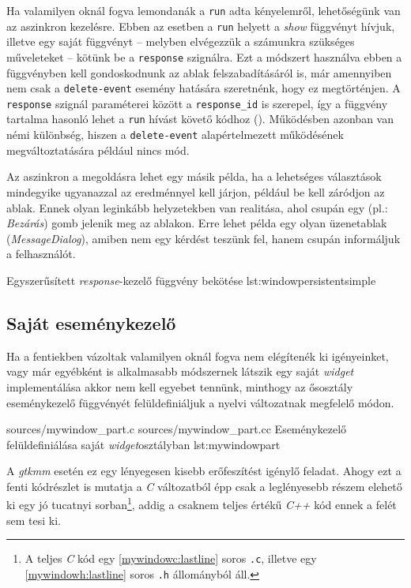 Ha valamilyen oknál fogva lemondanák a \texttt{run} adta kényelemről, lehetőségünk van az aszinkron kezelésre. Ebben az esetben a \texttt{run} helyett a \textit{show} függvényt hívjuk, illetve egy saját függvényt -- melyben elvégezzük a számunkra szükséges műveleteket -- kötünk be a \texttt{response} szignálra. Ezt a módszert használva ebben a függvényben kell gondoskodnunk az ablak felszabadításáról is, már amennyiben nem csak a \texttt{delete-event} esemény hatására szeretnénk, hogy ez megtörténjen. A \texttt{response} szignál paraméterei között a \texttt{response\_id} is szerepel, így a függvény tartalma hasonló lehet a \texttt{run} hívást követő kódhoz (). Működésben azonban van némi különbség, hiszen a \texttt{delete-event} alapértelmezett működésének megváltoztatására például nincs mód.

Az aszinkron a megoldásra lehet egy másik példa, ha a lehetséges választások mindegyike ugyanazzal az eredménnyel kell járjon, például be kell záródjon az ablak. Ennek olyan leginkább helyzetekben van realitása, ahol csupán egy (pl.: \textit{Bezárás}) gomb jelenik meg az ablakon. Erre lehet példa egy olyan üzenetablak (\textit{MessageDialog}), amiben nem egy kérdést teszünk fel, hanem csupán informáljuk a felhasználót.

{Egyszerűsített \textit{response}-kezelő függvény bekötése}
{lst:windowpersistentsimple}

\subsection{Saját eseménykezelő}

Ha a fentiekben vázoltak valamilyen oknál fogva nem elégítenék ki igényeinket, vagy már egyébként is alkalmasabb módszernek látszik egy saját \textit{widget} implementálása akkor nem kell egyebet tennünk, minthogy az ősosztály eseménykezelő függvényét felüldefiniáljuk a nyelvi változatnak megfelelő módon.

\lstinputsources
{sources/mywindow_part.c}
{sources/mywindow_part.cc}
{Eseménykezelő felüldefiniálása saját \textit{widget}osztályban}
{lst:mywindowpart}

A \textit{gtkmm} esetén ez egy lényegesen kisebb erőfeszítést igénylő feladat. Ahogy ezt a fenti kódrészlet is mutatja a \textit{C} változatból épp csak a leglényesebb részem elehető ki egy jó tucatnyi sorban\footnote{A teljes \textit{C} kód egy \ref{mywindowc:lastline} soros \texttt{.c}, illetve egy \ref{mywindowh:lastline} soros \texttt{.h} állományból áll.}, addig a csaknem teljes értékű \textit{C++} kód ennek a felét sem tesi ki.

